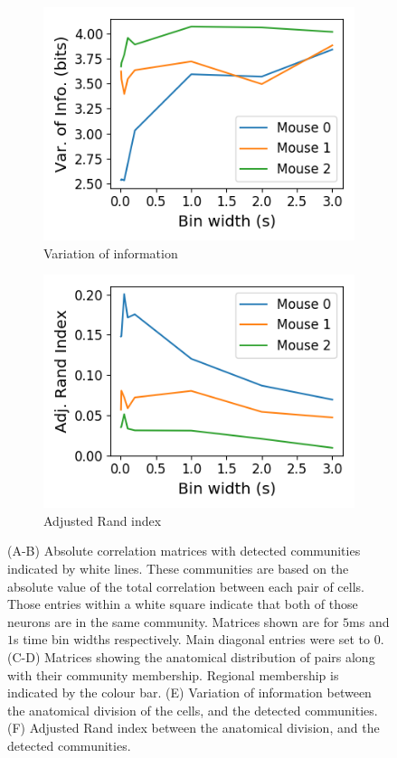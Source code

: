 \begin{figure}[p]
\begin{subfigure}[h]{0.5\linewidth}
      \includegraphics[width=\linewidth]{figures/eight_probe/variation_of_information_absolute_total.png}
      \caption{Variation of information}
      \label{fig:variation_of_information_absolute_total}
    \end{subfigure}
    \begin{subfigure}[h]{0.5\linewidth}
      \includegraphics[width=\linewidth]{figures/eight_probe/adjusted_rand_index_absolute_total.png}
      \caption{Adjusted Rand index}
      \label{fig:adjusted_rand_index_absolute_total}
    \end{subfigure}
    \caption{(A-B) Absolute correlation matrices with detected communities indicated by white lines. These communities are based on the absolute value of the total correlation between each pair of cells. Those entries within a white square indicate that both of those neurons are in the same community. Matrices shown are for $5$ms and $1$s time bin widths respectively. Main diagonal entries were set to $0$. (C-D) Matrices showing the anatomical distribution of pairs along with their community membership. Regional membership is indicated by the colour bar. (E) Variation of information between the anatomical division of the cells, and the detected communities. (F) Adjusted Rand index between the anatomical division, and the detected communities.}

\end{figure}
